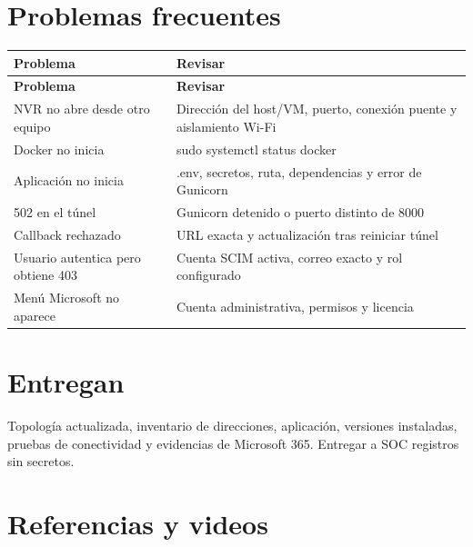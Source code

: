 \documentclass[12pt,a4paper]{article}
\begin{document}
\section*{Problemas frecuentes}
{\small\renewcommand{\arraystretch}{1.2}
\begin{longtable}{p{7.760cm}p{7.760cm}}
\toprule
\textbf{Problema} & \textbf{Revisar} \\ \midrule\endfirsthead
\textbf{Problema} & \textbf{Revisar} \\ \midrule\endhead
NVR no abre desde otro equipo & Dirección del host/VM, puerto, conexión puente y aislamiento Wi-Fi \\
Docker no inicia & \textnormal{sudo systemctl status docker} \\
Aplicación no inicia & \textnormal{.env}, secretos, ruta, dependencias y error de Gunicorn \\
502 en el túnel & Gunicorn detenido o puerto distinto de 8000 \\
Callback rechazado & URL exacta y actualización tras reiniciar túnel \\
Usuario autentica pero obtiene 403 & Cuenta SCIM activa, correo exacto y rol configurado \\
Menú Microsoft no aparece & Cuenta administrativa, permisos y licencia \\
\bottomrule\end{longtable}}
\section*{Entregan}
Topología actualizada, inventario de direcciones, aplicación, versiones instaladas, pruebas de conectividad y evidencias de Microsoft 365. Entregar a SOC registros sin secretos.\par
{}\section*{Referencias y videos}
\end{document}
